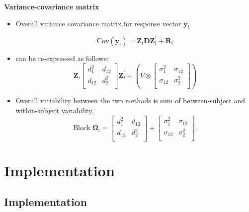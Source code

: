 \documentclass[compress]{beamer}        %
\makeatletter
\newcommand{\tcb}{\textcolor{beamer@blendedblue}}
\makeatother
\begin{document}


\begin{frame}{\bf \tcb{Variance-covariance matrix}}
\begin{itemize}
\item Overall variance covariance matrix for response vector $\boldsymbol{y}_i$

\[ \mbox{Cov}(\boldsymbol{y}_i)= \boldsymbol{Z}_i \boldsymbol{D}\boldsymbol{Z}^{\prime}_i + \boldsymbol{R}_i \]

\item can be re-expressed as follows:
\[\boldsymbol{Z}_i \left[ \begin{array}{cc} d^2_1 & d_{12}\\
d_{12} & d^2_2\\ \end{array}\right]\boldsymbol{Z}^{\prime}_i  +  \left(V \otimes \left[\begin{array}{cc} \sigma^2_1 & \sigma_{12}\\
\sigma_{12} & \sigma^2_2\\ \end{array}\right] \right)
\]

\item Overall variability between the two methods is sum of between-subject and within-subject variability,
\[
 \mbox{Block } \boldsymbol{\Omega}_i = \left[ \begin{array}{cc} d^2_1 & d_{12}\\ d_{12} & d^2_2\\ \end{array} \right]
+ \left[\begin{array}{cc} \sigma^2_1 & \sigma_{12}\\ \sigma_{12} & \sigma^2_2\\ \end{array}\right].
\]

\end{itemize}
\end{frame}



\section[Implementation]{Implementation}
\subsection{Implementation}
\end{document}
